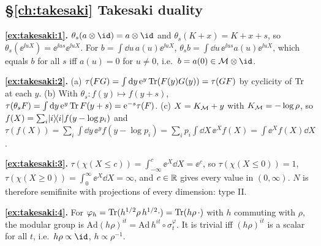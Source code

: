 {\subsection*{\S\ref{ch:takesaki} Takesaki duality}
\textbf{\ref{ex:takesaki:1}.} $\theta_s(a\otimes\id)=a\otimes\id$ and $\theta_s(K+x)=K+x+s$, so $\theta_s(\ee^{\ii uX})=\ee^{\ii us}\ee^{\ii uX}$. For $b=\int\dd u\,a(u)\ee^{\ii uX}$, $\theta_sb=\int\dd u\,\ee^{\ii us}a(u)\ee^{\ii uX}$, which equals $b$ for all $s$ iff $a(u)=0$ for $u\ne0$, i.e.\ $b=a(0)\in\M\otimes\id$.\par
\textbf{\ref{ex:takesaki:2}.} (a) $\tau(FG)=\int\mathrm{d} y\,\mathrm{e}^y\operatorname{Tr}(F(y)G(y))=\tau(GF)$ by cyclicity of $\operatorname{Tr}$ at each $y$. (b) With $\theta_s:f(y)\mapsto f(y+s)$, $\tau(\theta_sF)=\int\mathrm{d} y\,\mathrm{e}^y\operatorname{Tr} F(y+s)=\mathrm{e}^{-s}\tau(F)$. (c) $X=K_{\mathcal{M}}+y$ with $K_{\mathcal{M}}=-\log\rho$, so $f(X)=\sum_i\lvert i\rangle\!\langle i\rvert f(y-\log p_i)$ and $\tau(f(X))=\sum_i\int\dd y\,\ee^yf(y-\log p_i)=\sum_ip_i\int\dd X\,\ee^Xf(X)=\int\ee^Xf(X)\dd X$.\par
\textbf{\ref{ex:takesaki:3}.} $\tau(\chi(X\le c))=\int_{-\infty}^c\ee^X\dd X=\ee^c$, so $\tau(\chi(X\le0))=1$, $\tau(\chi(X\ge0))=\int_0^\infty\ee^X\dd X=\infty$, and $c\in\mathbb{R}$ gives every value in $(0,\infty)$. $N$ is therefore semifinite with projections of every dimension: type II.\par
\textbf{\ref{ex:takesaki:4}.} For $\varphi_h=\operatorname{Tr}(h^{1/2}\rho\,h^{1/2}\cdot)=\operatorname{Tr}(h\rho\,\cdot)$ with $h$ commuting with $\rho$, the modular group is $\mathrm{Ad}(h\rho)^{it}=\mathrm{Ad}\,h^{it}\circ\sigma^\varphi_t$. It is trivial iff $(h\rho)^{it}$ is a scalar for all $t$, i.e.\ $h\rho\propto\id$, $h\propto\rho^{-1}$.\par

}
